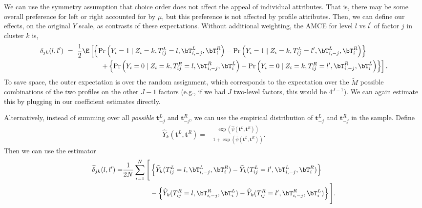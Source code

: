  
 We can use the symmetry assumption that choice order does not affect
 the appeal of individual attributes.  That is, there may be some
 overall preference for left or right accounted for by $\mu$, but this
 preference is not affected by profile attributes.  Then, we can
 define our effects, on the original $Y$ scale, as contrasts of these
 expectations.  Without additional weighting, the AMCE for level $l$
 vs $l^\prime$ of factor $j$ in cluster $k$ is,
\begin{align*}
\delta_{jk}(l, l^\prime) & \ = \ \frac{1}{2}\E \left[
                         \left\{\Pr\left(Y_i = 1 \mid Z_i=k, T^L_{ij}=l,
                         \bT^L_{i,-j}, \bT^R_{i}\right) -
                         \Pr\left(Y_i = 1 \mid Z_i=k, T^L_{ij}=l^\prime,
                         \bT^L_{i,-j}, \bT^R_{i}\right)
                         \right\}\right. \\
  & \hspace{.75in} \left.
                         +\left\{\Pr\left(Y_i = 0 \mid Z_i=k, T^R_{ij}=l,
                         \bT^R_{i,-j}, \bT^L_{i}\right) -
                         \Pr\left(Y_i = 0 \mid Z_i=k, T^R_{ij}=l^\prime,
                         \bT^R_{i,-j}, \bT^L_{i}\right)
    \right\}\right]. 
\end{align*}
To save space, the outer expectation is over the random assignment, which corresponds to the expectation over the $\tilde{M}$ possible combinations of the two profiles on the other $J-1$ factors (e.g., if we had $J$ two-level factors, this would be $4^{J-1}$).
We can again estimate this by plugging in our coefficient estimates directly.
 
 Alternatively, instead of summing over all \textit{possible} $\bm{t}^L_{-j}$ and $\bm{t}^R_{-j}$, we can use the empirical distribution of $\bm{t}^L_{-j}$ and $\bm{t}^R_{-j}$ in the sample.
 Define
  \begin{align*}
 \widehat{Y}_k(\bm{t}^L, \bm{t}^R)  =& \frac{\exp( \widehat{\psi}(\bm{t}^L, \bm{t}^R))}{1+\exp( \widehat{\psi}(\bm{t}^L, \bm{t}^R))}.
 \end{align*}
 Then we can use the estimator
  \begin{align*}
\widehat{\delta}_{jk}(l, l^\prime)= 
&\frac{1}{2N}\sum_{i=1}^N\Bigg[\left\{ \widehat{Y}_k(T^L_{ij}=l, \bT^L_{i,-j}, \bT^R_{i}) - \widehat{Y}_k(T^L_{ij}=l^\prime, \bT^L_{i,-j}, \bT^R_{i}) \right\}\\
 &\qquad \qquad -\left\{ \widehat{Y}_k(T^R_{ij}=l,
                         \bT^R_{i,-j}, \bT^L_{i}) - \widehat{Y}_k(T^R_{ij}=l^\prime,
                         \bT^R_{i,-j}, \bT^L_{i}) \right\}\Bigg].
\end{align*}


